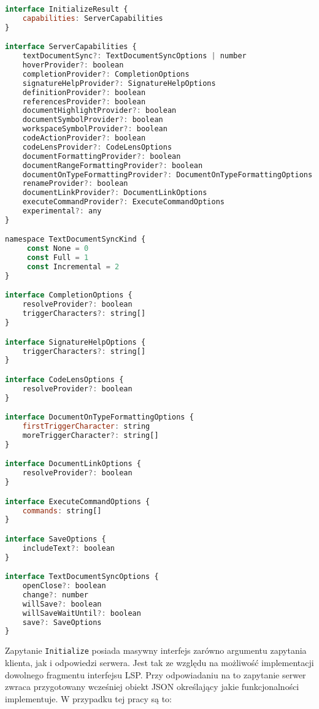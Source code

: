 \begin{lstlisting}[language=JavaScript, basicstyle=\fontsize{9}{10}\ttfamily, title=Struktura odpowiedzi]
interface InitializeResult {
    capabilities: ServerCapabilities
}

interface ServerCapabilities {
    textDocumentSync?: TextDocumentSyncOptions | number
    hoverProvider?: boolean
    completionProvider?: CompletionOptions
    signatureHelpProvider?: SignatureHelpOptions
    definitionProvider?: boolean
    referencesProvider?: boolean
    documentHighlightProvider?: boolean
    documentSymbolProvider?: boolean
    workspaceSymbolProvider?: boolean
    codeActionProvider?: boolean
    codeLensProvider?: CodeLensOptions
    documentFormattingProvider?: boolean
    documentRangeFormattingProvider?: boolean
    documentOnTypeFormattingProvider?: DocumentOnTypeFormattingOptions
    renameProvider?: boolean
    documentLinkProvider?: DocumentLinkOptions
    executeCommandProvider?: ExecuteCommandOptions
    experimental?: any
}

namespace TextDocumentSyncKind {
     const None = 0
     const Full = 1
     const Incremental = 2
}

interface CompletionOptions {
    resolveProvider?: boolean
    triggerCharacters?: string[]
}

interface SignatureHelpOptions {
    triggerCharacters?: string[]
}

interface CodeLensOptions {
    resolveProvider?: boolean
}

interface DocumentOnTypeFormattingOptions {
    firstTriggerCharacter: string
    moreTriggerCharacter?: string[]
}

interface DocumentLinkOptions {
    resolveProvider?: boolean
}

interface ExecuteCommandOptions {
    commands: string[]
}

interface SaveOptions {
    includeText?: boolean
}

interface TextDocumentSyncOptions {
    openClose?: boolean
    change?: number
    willSave?: boolean
    willSaveWaitUntil?: boolean
    save?: SaveOptions
}
\end{lstlisting}
Zapytanie \texttt{Initialize} posiada masywny interfejs zarówno argumentu zapytania klienta, jak i odpowiedzi serwera. Jest tak ze względu na możliwość implementacji dowolnego fragmentu interfejsu LSP. Przy odpowiadaniu na to zapytanie serwer zwraca przygotowany wcześniej obiekt JSON określający jakie funkcjonalności implementuje. W przypadku tej pracy są to:


